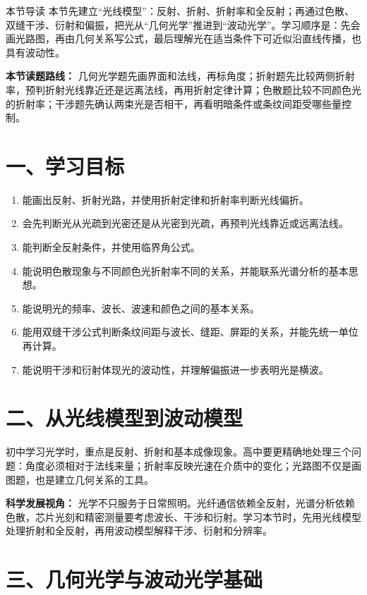 
\begin{learningbox}{本节导读}
本节先建立“光线模型”：反射、折射、折射率和全反射；再通过色散、双缝干涉、衍射和偏振，把光从“几何光学”推进到“波动光学”。学习顺序是：先会画光路图，再由几何关系写公式，最后理解光在适当条件下可近似沿直线传播，也具有波动性。
\end{learningbox}

\textbf{本节读题路线：} 几何光学题先画界面和法线，再标角度；折射题先比较两侧折射率，预判折射光线靠近还是远离法线，再用折射定律计算；色散题比较不同颜色光的折射率；干涉题先确认两束光是否相干，再看明暗条件或条纹间距受哪些量控制。

\section*{一、学习目标}
\begin{enumerate}
  \item 能画出反射、折射光路，并使用折射定律和折射率判断光线偏折。
  \item 会先判断光从光疏到光密还是从光密到光疏，再预判光线靠近或远离法线。
  \item 能判断全反射条件，并使用临界角公式。
  \item 能说明色散现象与不同颜色光折射率不同的关系，并能联系光谱分析的基本思想。
  \item 能说明光的频率、波长、波速和颜色之间的基本关系。
  \item 能用双缝干涉公式判断条纹间距与波长、缝距、屏距的关系，并能先统一单位再计算。
  \item 能说明干涉和衍射体现光的波动性，并理解偏振进一步表明光是横波。
\end{enumerate}
\section*{二、从光线模型到波动模型}

初中学习光学时，重点是反射、折射和基本成像现象。高中要更精确地处理三个问题：角度必须相对于法线来量；折射率反映光速在介质中的变化；光路图不仅是画图题，也是建立几何关系的工具。

\textbf{科学发展视角：} 光学不只服务于日常照明。光纤通信依赖全反射，光谱分析依赖色散，芯片光刻和精密测量要考虑波长、干涉和衍射。学习本节时，先用光线模型处理折射和全反射，再用波动模型解释干涉、衍射和分辨率。

\section*{三、几何光学与波动光学基础}

